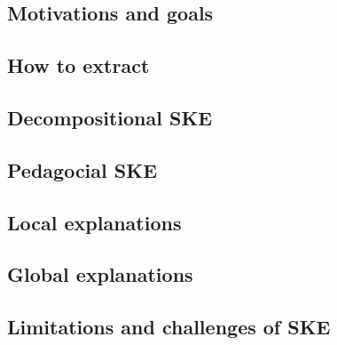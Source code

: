 \subsection{Motivations and goals}\label{subsec:ske-motivations-and-goals}

\subsection{How to extract}\label{subsec:how-to-extract}

\subsection{Decompositional \Gls{SKE}}\label{subsec:decompositional-ske}

\subsection{Pedagocial \Gls{SKE}}\label{subsec:pedagogical-ske}

\subsection{Local explanations}\label{subsec:local-explanations}

\subsection{Global explanations}\label{subsec:global-explanations}

\subsection{Limitations and challenges of \Gls{SKE}}\label{subsec:limitations-and-challenges-of-ske}